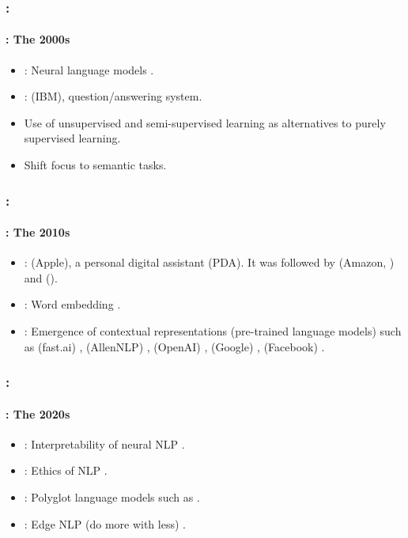 \documentclass[xcolor=table]{beamer}
\begin{document}
\begin{frame}
	\frametitle{\insertshortsubtitle: \insertsection}
	\framesubtitle{\insertsubsection: The 2000s}

	\begin{itemize}
		\item {}: Neural language models \cite{2003-bengio-al}.
		\item {}:  (IBM), question/answering system.
		\item Use of unsupervised and semi-supervised learning as alternatives to purely supervised learning.
		\item Shift focus to semantic tasks.
	\end{itemize}

\end{frame}

\begin{frame}
	\frametitle{\insertshortsubtitle: \insertsection}
	\framesubtitle{\insertsubsection: The 2010s}

	\begin{itemize}
		\item {}:  (Apple),  a personal digital assistant (PDA). 
		It was followed by  (Amazon, ) and  ().
		\item {}: Word embedding \cite{2014-lebret-collobert}.
		\item {}: Emergence of contextual representations (pre-trained language models) such as  (fast.ai) \cite{2018-howard-ruder},  (AllenNLP) \cite{2018-peters-al},  (OpenAI) \cite{2018-radford-al},  (Google) \cite{2018-devlin-al},  (Facebook) \cite{2019-lample-conneau}.
	\end{itemize}

\end{frame}

\begin{frame}
	\frametitle{\insertshortsubtitle: \insertsection}
	\framesubtitle{\insertsubsection: The 2020s}
	
	\begin{itemize}
		\item {}: Interpretability of neural NLP \cite{2020-belinkov-al,2020-kim-al,2020-jacovi-goldberg}.
		\item {}: Ethics of NLP \cite{2021-garridoMunoz-al,2021-field-al}.
		\item {}: Polyglot language models such as  \cite{2022-fu-al}.
		\item {}: Edge NLP (do more with less) \cite{2022-guo-al}.
	\end{itemize}
	
\end{frame}
\end{document}
